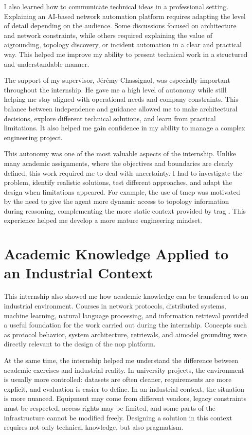 \documentclass[11pt,a4paper]{report}
\begin{document}
I also learned how to communicate technical ideas in a professional setting. Explaining an AI-based network automation platform requires adapting the level of detail depending on the audience. Some discussions focused on architecture and network constraints, while others required explaining the value of \gls{ai}\gls{grounding}, topology discovery, or incident automation in a clear and practical way. This helped me improve my ability to present technical work in a structured and understandable manner.

The support of my supervisor, Jérémy Chassignol, was especially important throughout the internship. He gave me a high level of autonomy while still helping me stay aligned with operational needs and company constraints. This balance between independence and guidance allowed me to make architectural decisions, explore different technical solutions, and learn from practical limitations. It also helped me gain confidence in my ability to manage a complex engineering project.

This autonomy was one of the most valuable aspects of the internship. Unlike many academic assignments, where the objectives and boundaries are clearly defined, this work required me to deal with uncertainty. I had to investigate the problem, identify realistic solutions, test different approaches, and adapt the design when limitations appeared. For example, the use of  \gls{tmcp}  was motivated by the need to give the agent more dynamic access to topology information during reasoning, complementing the more static context provided by  \gls{trag} . This experience helped me develop a more mature engineering mindset.

\section*{Academic Knowledge Applied to an Industrial Context}

This internship also showed me how academic knowledge can be transferred to an industrial environment. Courses in network protocols, distributed systems, machine learning, natural language processing, and information retrieval provided a useful foundation for the work carried out during the internship. Concepts such as protocol behavior, system architecture, \gls{retrieval}s, and \gls{ai}model \gls{grounding} were directly relevant to the design of the  \gls{nop}  platform.

At the same time, the internship helped me understand the difference between academic exercises and industrial reality. In university projects, the environment is usually more controlled: datasets are often cleaner, requirements are more explicit, and evaluation is easier to define. In an industrial context, the situation is more nuanced. Equipment may come from different vendors, legacy constraints must be respected, access rights may be limited, and some parts of the infrastructure cannot be modified freely. Designing a solution in this context requires not only technical knowledge, but also pragmatism.
\end{document}
